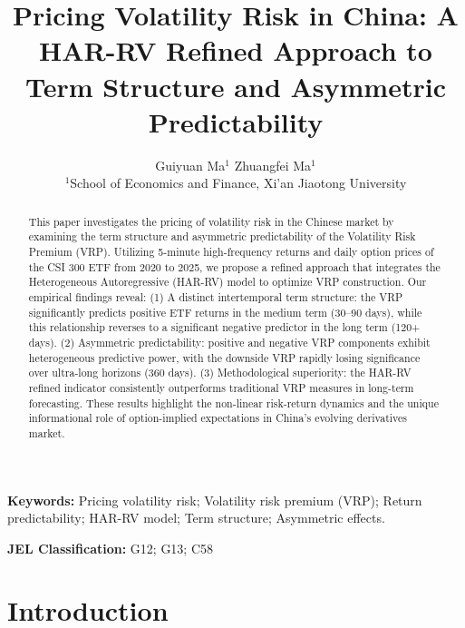\documentclass[a4paper, 12pt]{article}    %
\title{Pricing Volatility Risk in China: A HAR-RV Refined Approach to Term Structure and Asymmetric Predictability }
\author{
    Guiyuan Ma$^{1}$ \qquad Zhuangfei Ma$^{1}$ %
    \\
    $^{1}$School of Economics and Finance, Xi'an Jiaotong University %
}
\date{}  %
\begin{document}
\maketitle

\begin{abstract}
    This paper investigates the pricing of volatility risk in the Chinese market by examining the term structure and asymmetric predictability of the Volatility Risk Premium (VRP). Utilizing 5-minute high-frequency returns and daily option prices of the CSI 300 ETF from 2020 to 2025, we propose a refined approach that integrates the Heterogeneous Autoregressive (HAR-RV) model to optimize VRP construction. Our empirical findings reveal: (1) A distinct intertemporal term structure: the VRP significantly predicts positive ETF returns in the medium term (30–90 days), while this relationship reverses to a significant negative predictor in the long term (120+ days). (2) Asymmetric predictability: positive and negative VRP components exhibit heterogeneous predictive power, with the downside VRP rapidly losing significance over ultra-long horizons (360 days). (3) Methodological superiority: the HAR-RV refined indicator consistently outperforms traditional VRP measures in long-term forecasting. These results highlight the non-linear risk-return dynamics and the unique informational role of option-implied expectations in China's evolving derivatives market.
\end{abstract}
\bigskip

  \par\textbf{Keywords:} Pricing volatility risk; Volatility risk premium (VRP); Return predictability; HAR-RV model; Term structure; Asymmetric effects.
\par\textbf{JEL Classification:} G12; G13; C58
\newpage  %

\section{Introduction}
\end{document}
